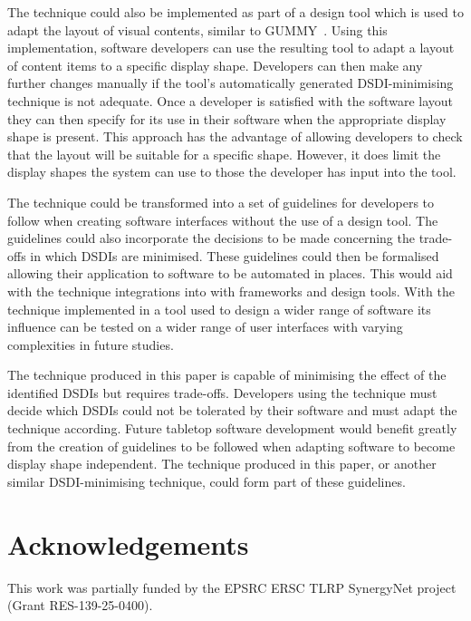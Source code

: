 \documentclass[review,5p,times,twocolumn]{elsarticle}
\begin{document}
The technique could also be implemented as part of a design tool which is used to adapt the layout of visual contents, similar to GUMMY~\cite{Meskens2008}.
Using this implementation, software developers can use the resulting tool to adapt a layout of content items to a specific display shape.
Developers can then make any further changes manually if the tool's automatically generated \ac{DSDI}-minimising technique is not adequate.
Once a developer is satisfied with the software layout they can then specify for its use in their software when the appropriate display shape is present.
This approach has the advantage of allowing developers to check that the layout will be suitable for a specific shape.
However, it does limit the display shapes the system can use to those the developer has input into the tool.

The technique could be transformed into a set of guidelines for developers to follow when creating software interfaces without the use of a design tool.
The guidelines could also incorporate the decisions to be made concerning the trade-offs in which \acp{DSDI} are minimised.
These guidelines could then be formalised~\cite{Ngo2000} allowing their application to software to be automated in places.
This would aid with the technique integrations into with frameworks and design tools.
With the technique implemented in a tool used to design a wider range of software its influence can be tested on a wider range of user interfaces with varying complexities in future studies.

The technique produced in this paper is capable of minimising the effect of the identified \acp{DSDI} but requires trade-offs.
Developers using the technique must decide which \acp{DSDI} could not be tolerated by their software and must adapt the technique according.
Future tabletop software development would benefit greatly from the creation of guidelines to be followed when adapting software to become display shape independent.
The technique produced in this paper, or another similar \ac{DSDI}-minimising technique, could form part of these guidelines.

\section*{Acknowledgements}

This work was partially funded by the EPSRC ERSC TLRP SynergyNet project (Grant RES-139-25-0400).






\end{document}
